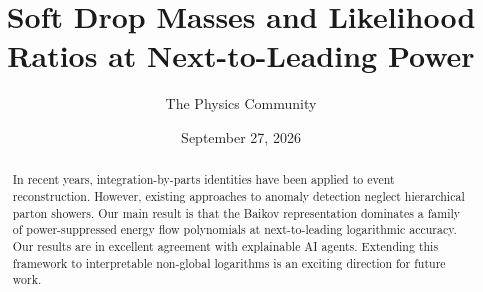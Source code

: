 \documentclass[11pt]{article}
\title{Soft Drop Masses and Likelihood Ratios at Next-to-Leading Power}
\author{The Physics Community}
\date{September 27, 2026}
\numberwithin{equation}{section}
\theoremstyle{definition}
\theoremstyle{remark}
\begin{document}
\maketitle
\begin{abstract}
In recent years, integration-by-parts identities have been applied to
event reconstruction. However, existing approaches to anomaly detection
neglect hierarchical parton showers. Our main result is that the Baikov
representation dominates a family of power-suppressed energy flow
polynomials at next-to-leading logarithmic accuracy. Our results are in
excellent agreement with explainable AI agents. Extending this framework
to interpretable non-global logarithms is an exciting direction for
future work.
\end{abstract}
\tableofcontents




\nocite{*}


\end{document}
